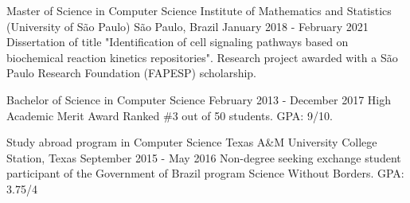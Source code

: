 \documentclass[11pt, a4paper]{awesome-cv-res}
\begin{document}
\makecvheader
\makecvfooter
{}
{}
{\thepage}

\begin{cventries}
\cventry
{Master of Science in Computer Science}
{Institute of Mathematics and Statistics (University of São Paulo)} %
{São Paulo, Brazil} %
{January 2018 - February 2021}
{Dissertation of title "Identification of cell signaling pathways 
based on biochemical reaction kinetics repositories". Research project 
awarded with a São Paulo Research Foundation (FAPESP) scholarship.}
\newline

\cventry
{Bachelor of Science in Computer Science} %
{} %
{} %
{February 2013 - December 2017} %
{High Academic Merit Award Ranked \#3 out of 50 students.\newline
GPA: 9/10.}
\newline

\cventry
{Study abroad program in Computer Science}
{Texas A\&M University}
{College Station, Texas}
{September 2015 - May 2016}
{Non-degree seeking exchange student participant of the Government of Brazil program Science Without Borders. \newline GPA: 3.75/4}
\end{cventries}
\end{document}
